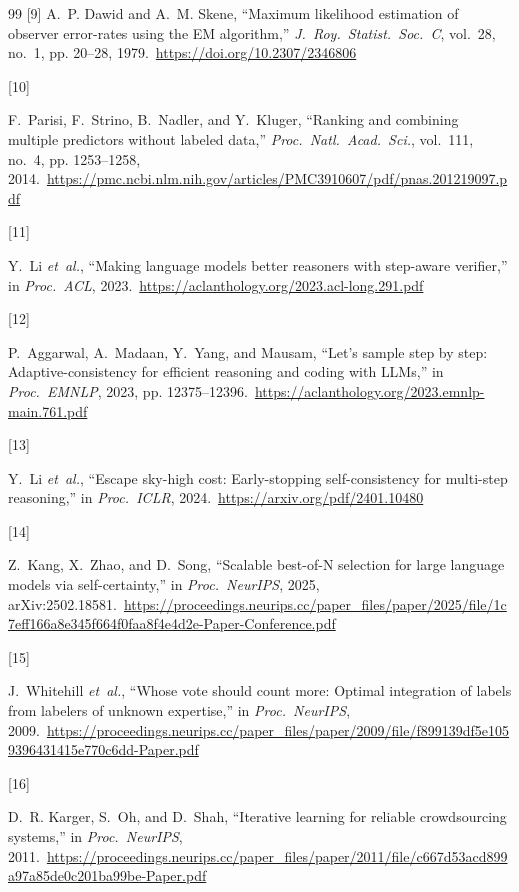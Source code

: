 \documentclass[conference]{IEEEtran}
\begin{document}
\begin{thebibliography}{99}
\hypertarget{bib:dawid1979maximum}{[9]} 
A.~P. Dawid and A.~M. Skene, ``Maximum likelihood estimation of observer error-rates using the EM algorithm,'' \emph{J.\ Roy.\ Statist.\ Soc.\ C}, vol.~28, no.~1, pp. 20--28, 1979.\ \url{https://doi.org/10.2307/2346806}

\hypertarget{bib:parisi2014ranking}{[10]} 
F.~Parisi, F.~Strino, B.~Nadler, and Y.~Kluger, ``Ranking and combining multiple predictors without labeled data,'' \emph{Proc.\ Natl.\ Acad.\ Sci.}, vol.~111, no.~4, pp. 1253--1258, 2014.\ \url{https://pmc.ncbi.nlm.nih.gov/articles/PMC3910607/pdf/pnas.201219097.pdf}

\hypertarget{bib:li2023diverse}{[11]} 
Y.~Li \emph{et~al.}, ``Making language models better reasoners with step-aware verifier,'' in \emph{Proc.\ ACL}, 2023.\ \url{https://aclanthology.org/2023.acl-long.291.pdf}

\hypertarget{bib:aggarwal2023adaptive}{[12]} 
P.~Aggarwal, A.~Madaan, Y.~Yang, and Mausam, ``Let's sample step by step: Adaptive-consistency for efficient reasoning and coding with {LLMs},'' in \emph{Proc.\ EMNLP}, 2023, pp. 12375--12396.\ \url{https://aclanthology.org/2023.emnlp-main.761.pdf}

\hypertarget{bib:li2024escape}{[13]} 
Y.~Li \emph{et~al.}, ``Escape sky-high cost: Early-stopping self-consistency for multi-step reasoning,'' in \emph{Proc.\ ICLR}, 2024.\ \url{https://arxiv.org/pdf/2401.10480}

\hypertarget{bib:borda2025}{[14]} 
Z.~Kang, X.~Zhao, and D.~Song, ``Scalable best-of-N selection for large language models via self-certainty,'' in \emph{Proc.\ NeurIPS}, 2025, arXiv:2502.18581.\ \url{https://proceedings.neurips.cc/paper_files/paper/2025/file/1c7eff166a8e345f664f0faa8f4e4d2e-Paper-Conference.pdf}

\hypertarget{bib:whitehill2009whose}{[15]} 
J.~Whitehill \emph{et~al.}, ``Whose vote should count more: Optimal integration of labels from labelers of unknown expertise,'' in \emph{Proc.\ NeurIPS}, 2009.\ \url{https://proceedings.neurips.cc/paper_files/paper/2009/file/f899139df5e1059396431415e770c6dd-Paper.pdf}

\hypertarget{bib:karger2011iterative}{[16]} 
D.~R. Karger, S.~Oh, and D.~Shah, ``Iterative learning for reliable crowdsourcing systems,'' in \emph{Proc.\ NeurIPS}, 2011.\ \url{https://proceedings.neurips.cc/paper_files/paper/2011/file/c667d53acd899a97a85de0c201ba99be-Paper.pdf}


\end{thebibliography}
\end{document}
